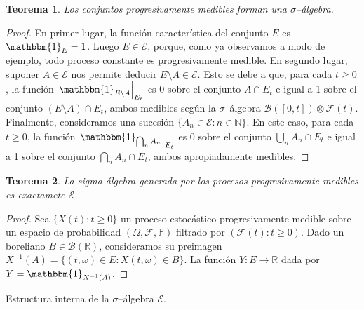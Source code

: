 \documentclass{report}
\newcommand{\restrict}[2]{\left.#1\right|_{#2}}
\newcommand{\characteristic}{\mathbbm{1}}
\newcommand{\prob}{\mathbb{P}}
\newcommand{\events}{\mathcal{F}}
\newcommand{\borel}{\mathscr{B}}
\newcommand{\progressiveAlgebra}{\mathscr{E}}
\newcommand{\naturalNumbers}{\mathbb{N}}
\newcommand{\realNumbers}{\mathbb{R}}
\theoremstyle{plain}
\newtheorem{theorem}{Teorema}
\newtheorem{property}{Propiedad}
\theoremstyle{remark}
\theoremstyle{definition}
\begin{document}

\begin{theorem}
  Los conjuntos progresivamente medibles forman una \(\sigma\)--álgebra.
\end{theorem}
\begin{proof}
  En primer lugar, la función característica del conjunto \(E\) es \({\characteristic_E = 1}\).
  Luego \(E \in \progressiveAlgebra\), porque, como ya observamos a modo de ejemplo, todo proceso constante es progresivamente medible.
  En segundo lugar, suponer \(A \in \progressiveAlgebra\) nos permite deducir \(E \setminus A \in \progressiveAlgebra\).
  Esto se debe a que, para cada \(t \geq 0\), la función \(\restrict{\characteristic_{E \setminus A}}{E_t}\) es 0 sobre el conjunto \(A \cap E_t\) e igual a 1 sobre el conjunto \((E \setminus A) \cap E_t\), ambos medibles según la \(\sigma\)--álgebra \(\borel([0, t]) \otimes \events(t)\).
  Finalmente, consideramos una sucesión \(\{A_n \in \progressiveAlgebra : n \in \naturalNumbers\}\).
  En este caso, para cada \(t \geq 0\), la función \(\restrict{\characteristic_{\bigcap_n A_n}}{E_t}\)
  es 0 sobre el conjunto \(\bigcup_n A_n \cap E_t\) e igual a 1 sobre el conjunto \(\bigcap_n A_n \cap E_t\), ambos apropiadamente medibles.
\end{proof}

\begin{theorem}
  La sigma álgebra generada por los procesos progresivamente medibles es exactamete \(\progressiveAlgebra\).
\end{theorem}
\begin{proof}
  Sea \(\{X(t) : t \geq 0\}\) un proceso estocástico progresivamente medible sobre un espacio de probabilidad \((\Omega, \events, \prob)\) filtrado por \((\events(t) : t \geq 0)\).
  Dado un boreliano \(B \in \borel(\realNumbers)\), consideramos su preimagen \(X^{- 1}(A) = \{(t, \omega) \in E : X(t, \omega) \in B\}\).
  La función \(Y : E \rightarrow \realNumbers\) dada por \(Y = \characteristic_{X^{- 1}(A)}\).
\end{proof}

Estructura interna de la \(\sigma\)--álgebra \(\progressiveAlgebra\).
\end{document}
